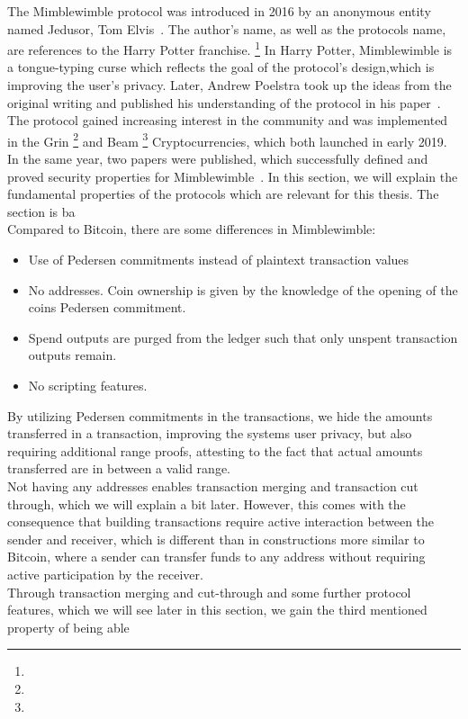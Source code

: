 The Mimblewimble protocol was introduced in 2016 by an anonymous entity named Jedusor, Tom Elvis~\cite{jedusor2016mimblewimble}. The author's name, as well as the protocols name,
are references to the Harry Potter franchise. \footnote{\urlharrypotter} In Harry Potter, Mimblewimble is a tongue-typing curse which reflects
the goal of the protocol's design,which is improving the user's privacy.
Later, Andrew Poelstra took up the ideas from the original writing and published his understanding of the protocol in his paper~\cite{poelstra2016mimblewimble}.
The protocol gained increasing interest in the community and was implemented in the Grin \footnote{\urlgrin} and Beam \footnote{\urlbeam} Cryptocurrencies, which both launched in early 2019. In the same year,
two papers were published, which successfully defined and proved security properties for Mimblewimble~\cite{fuchsbauer2019aggregate,betarte2019towards}. In this section, we will explain the fundamental properties of the
protocols which are relevant for this thesis. The section is ba
\\
Compared to Bitcoin, there are some differences in Mimblewimble:~\cite{fuchsbauer2019aggregate}
\begin{itemize}
    \item Use of Pedersen commitments instead of plaintext transaction values
    \item No addresses. Coin ownership is given by the knowledge of the opening of the coins Pedersen commitment.
    \item Spend outputs are purged from the ledger such that only unspent transaction outputs remain.
    \item No scripting features.
\end{itemize}
By utilizing Pedersen commitments in the transactions, we hide the amounts transferred in a transaction,
improving the systems user privacy, but also requiring additional range proofs, attesting to the fact that actual amounts transferred are in between a valid range.\\
Not having any addresses enables transaction merging and transaction cut through, which we will explain a bit later.
However, this comes with the consequence that building transactions require active interaction between the sender and receiver,
which is different than in constructions more similar to Bitcoin, where a sender can transfer funds to any address without requiring active participation by the receiver.\\
Through transaction merging and cut-through and some further protocol features, which we will see later in this section, we gain the third mentioned property of being able
